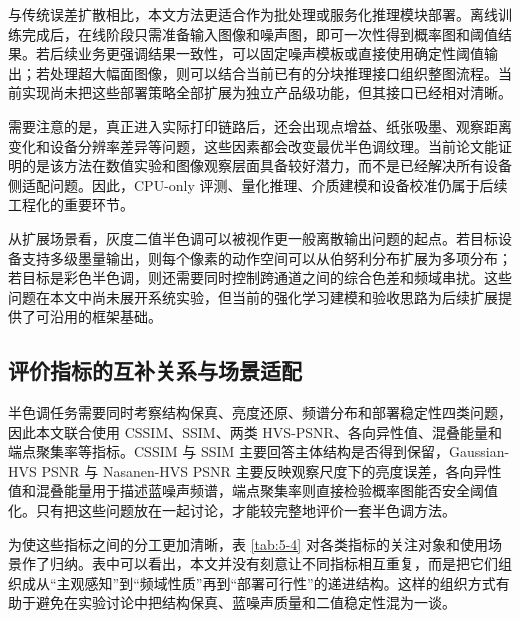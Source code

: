 \documentclass[thesis]{../zstucs-graduation-project}
\begin{document}
与传统误差扩散相比，本文方法更适合作为批处理或服务化推理模块部署。离线训练完成后，在线阶段只需准备输入图像和噪声图，即可一次性得到概率图和阈值结果。若后续业务更强调结果一致性，可以固定噪声模板或直接使用确定性阈值输出；若处理超大幅面图像，则可以结合当前已有的分块推理接口组织整图流程。当前实现尚未把这些部署策略全部扩展为独立产品级功能，但其接口已经相对清晰。

需要注意的是，真正进入实际打印链路后，还会出现点增益、纸张吸墨、观察距离变化和设备分辨率差异等问题，这些因素都会改变最优半色调纹理。当前论文能证明的是该方法在数值实验和图像观察层面具备较好潜力，而不是已经解决所有设备侧适配问题。因此，CPU-only 评测、量化推理、介质建模和设备校准仍属于后续工程化的重要环节。

从扩展场景看，灰度二值半色调可以被视作更一般离散输出问题的起点。若目标设备支持多级墨量输出，则每个像素的动作空间可以从伯努利分布扩展为多项分布；若目标是彩色半色调，则还需要同时控制跨通道之间的综合色差和频域串扰。这些问题在本文中尚未展开系统实验，但当前的强化学习建模和验收思路为后续扩展提供了可沿用的框架基础。

\subsection{评价指标的互补关系与场景适配}
半色调任务需要同时考察结构保真、亮度还原、频谱分布和部署稳定性四类问题，因此本文联合使用 CSSIM、SSIM、两类 HVS-PSNR、各向异性值、混叠能量和端点聚集率等指标。CSSIM 与 SSIM 主要回答主体结构是否得到保留，Gaussian-HVS PSNR 与 Nasanen-HVS PSNR 主要反映观察尺度下的亮度误差，各向异性值和混叠能量用于描述蓝噪声频谱，端点聚集率则直接检验概率图能否安全阈值化。只有把这些问题放在一起讨论，才能较完整地评价一套半色调方法。

为使这些指标之间的分工更加清晰，表 \ref{tab:5-4} 对各类指标的关注对象和使用场景作了归纳。表中可以看出，本文并没有刻意让不同指标相互重复，而是把它们组织成从“主观感知”到“频域性质”再到“部署可行性”的递进结构。这样的组织方式有助于避免在实验讨论中把结构保真、蓝噪声质量和二值稳定性混为一谈。
\end{document}
